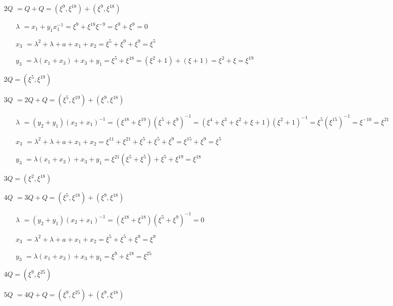 \documentclass[fleqn]{article}
\begin{document}
    \begin{itemize}
        \item[$2Q$] $ = Q + Q = (\xi^9, \xi^{18}) + (\xi^9, \xi^{18})$
                    \begin{itemize}
                        \item[$\lambda$] $ = x_1 + y_1 x_1^{-1} = \xi^9 + \xi^{18} \xi^{-9} = \xi^9 + \xi^9 = 0$
                        \item[$x_3$] $ = \lambda^2 + \lambda + a + x_1 + x_2 = \xi^5 + \xi^9 + \xi^{9} = \xi^{5}$
                        \item[$y_3$] $ = \lambda(x_1 + x_3) + x_3 + y_1 = \xi^{5} + \xi^{18} = (\xi^2 + 1) + (\xi + 1) = \xi^2 + \xi = \xi^{19}$
                    \end{itemize}
                    $2Q = (\xi^{5}, \xi^{19})$
        \item[$3Q$] $ = 2Q + Q = (\xi^{5}, \xi^{19}) + (\xi^9, \xi^{18})$
                    \begin{itemize}
                        \item[$\lambda$] $ = (y_2 + y_1)(x_2 + x_1)^{-1} = (\xi^{18} + \xi^{19})(\xi^{5} + \xi^{9})^{-1} = (\xi^4 + \xi^3 + \xi^2 + \xi + 1)(\xi^2 + 1)^{-1} = \xi^{5} (\xi^{15})^{-1} = \xi^{-10} = \xi^{21}$
                        \item[$x_3$] $ = \lambda^2 + \lambda + a + x_1 + x_2 = \xi^{11} + \xi^{21} + \xi^{5} + \xi^{5} + \xi^{9} = \xi^{15} + \xi^9 = \xi^5$
                        \item[$y_3$] $ = \lambda(x_1 + x_3) + x_3 + y_1 = \xi^{21}(\xi^5 + \xi^5) + \xi^5 + \xi^{19} = \xi^{18}$
                    \end{itemize}
                    $3Q = (\xi^{2}, \xi^{18})$
        \item[$4Q$] $ = 3Q + Q = (\xi^{5}, \xi^{18}) + (\xi^9, \xi^{18})$
            \begin{itemize}
                \item[$\lambda$] $ = (y_2 + y_1)(x_2 + x_1)^{-1} = (\xi^{18} + \xi^{18})(\xi^{5} + \xi^{9})^{-1} = 0$
                \item[$x_3$] $ = \lambda^2 + \lambda + a + x_1 + x_2 = \xi^{5} + \xi^{5} + \xi^{9} = \xi^{9}$
                \item[$y_3$] $ = \lambda(x_1 + x_3) + x_3 + y_1 = \xi^{9} + \xi^{18} = \xi^{25}$
            \end{itemize}
            $4Q = (\xi^{9}, \xi^{25})$
        \item[$5Q$] $ = 4Q + Q = (\xi^{9}, \xi^{25}) + (\xi^9, \xi^{18})$

\end{itemize}
\end{document}
